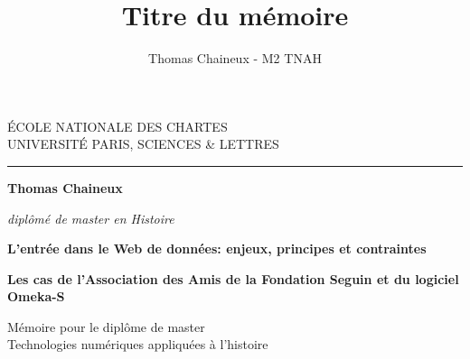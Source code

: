 \documentclass[a4paper,12pt,twoside]{book}
\author{Thomas Chaineux - M2 TNAH}
\title{Titre du mémoire}
\begin{document}
	\begin{titlepage}
		\begin{center}
			
			\bigskip
			
			\begin{large}				
				ÉCOLE NATIONALE DES CHARTES\\
				UNIVERSITÉ PARIS, SCIENCES \& LETTRES
			\end{large}
			\begin{center}\rule{2cm}{0.02cm}\end{center}
			
			\bigskip
			\bigskip
			\bigskip
			\begin{Large}
				\textbf{Thomas Chaineux}\\
			\end{Large}
			\begin{normalsize}
				\textit{diplômé de master en Histoire}
			\end{normalsize}
			
			\bigskip
			\bigskip
			\bigskip
			
			\begin{Huge}
				\textbf{L'entrée dans le Web de données: enjeux, principes et contraintes}\\
			\end{Huge}
			\bigskip
			\bigskip
			\begin{LARGE}
				\textbf{Les cas de l'Association des Amis de la Fondation Seguin et du logiciel Omeka-S}\\
			\end{LARGE}
			
			\bigskip
			\bigskip
			\bigskip
			\begin{large}
			\end{large}
			\vfill
			
			\begin{large}
				Mémoire 
				pour le diplôme de master \\
				\og {} Technologies numériques appliquées à l'histoire  \fg{}{} \\
			\end{large}
			
		\end{center}
	\end{titlepage}
	
	\thispagestyle{empty}	
	\cleardoublepage
	
	\frontmatter
\end{document}
